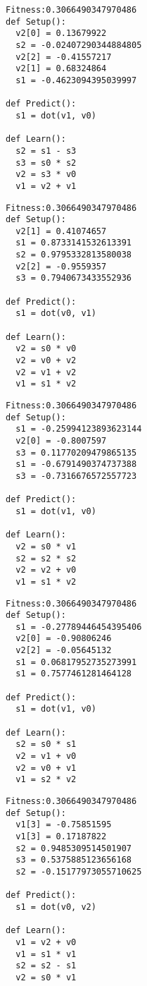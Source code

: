 \documentclass[twocolumn, a4j]{jarticle}
\begin{document}
\begin{lstlisting}[caption= No. 0.6]
Fitness:0.3066490347970486 
def Setup():
  v2[0] = 0.13679922
  s2 = -0.02407290344884805
  v2[2] = -0.41557217
  v2[1] = 0.68324864
  s1 = -0.4623094395039997

def Predict():
  s1 = dot(v1, v0)

def Learn():
  s2 = s1 - s3
  s3 = s0 * s2
  v2 = s3 * v0
  v1 = v2 + v1

\end{lstlisting}

\newpage

\begin{lstlisting}[caption= No. 0.7]
Fitness:0.3066490347970486 
def Setup():
  v2[1] = 0.41074657
  s1 = 0.8733141532613391
  s2 = 0.9795332813580038
  v2[2] = -0.9559357
  s3 = 0.7940673433552936

def Predict():
  s1 = dot(v0, v1)

def Learn():
  v2 = s0 * v0
  v2 = v0 + v2
  v2 = v1 + v2
  v1 = s1 * v2

\end{lstlisting}

\begin{lstlisting}[caption= No. 0.8]
Fitness:0.3066490347970486 
def Setup():
  s1 = -0.25994123893623144
  v2[0] = -0.8007597
  s3 = 0.11770209479865135
  s1 = -0.6791490374737388
  s3 = -0.7316676572557723

def Predict():
  s1 = dot(v1, v0)

def Learn():
  v2 = s0 * v1
  s2 = s2 * s2
  v2 = v2 + v0
  v1 = s1 * v2

\end{lstlisting}

\newpage

\begin{lstlisting}[caption= No. 0.9]
Fitness:0.3066490347970486 
def Setup():
  s1 = -0.27789446454395406
  v2[0] = -0.90806246
  v2[2] = -0.05645132
  s1 = 0.06817952735273991
  s1 = 0.7577461281464128

def Predict():
  s1 = dot(v1, v0)

def Learn():
  s2 = s0 * s1
  v2 = v1 + v0
  v2 = v0 + v1
  v1 = s2 * v2

\end{lstlisting}

\begin{lstlisting}[caption= No. 0.10]
Fitness:0.3066490347970486 
def Setup():
  v1[3] = -0.75851595
  v1[3] = 0.17187822
  s2 = 0.9485309514501907
  s3 = 0.5375885123656168
  s2 = -0.15177973055710625

def Predict():
  s1 = dot(v0, v2)

def Learn():
  v1 = v2 + v0
  v1 = s1 * v1
  s2 = s2 - s1
  v2 = s0 * v1

\end{lstlisting}
\end{document}
